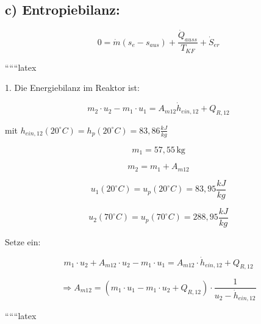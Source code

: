 \subsection*{c) Entropiebilanz:}

\[
0 = \dot{m} \left( s_{e} - s_{aus} \right) + \frac{\dot{Q}_{auss}}{T_{KF}} + \dot{S}_{er}
\]

``````latex


1. Die Energiebilanz im Reaktor ist:

\begin{equation}
m_2 \cdot u_2 - m_1 \cdot u_1 = A_{m12} \dot{h}_{ein,12} + Q_{R,12}
\end{equation}

mit $h_{ein,12} (20^\circ C) = h_p(20^\circ C) = 83,86 \frac{kJ}{kg}$

\begin{equation}
m_1 = 57,55 \, \text{kg}
\end{equation}

\begin{equation}
m_2 = m_1 + A_{m12}
\end{equation}

\begin{equation}
u_1 (20^\circ C) = u_p(20^\circ C) = 83,95 \frac{kJ}{kg}
\end{equation}

\begin{equation}
u_2 (70^\circ C) = u_p(70^\circ C) = 288,95 \frac{kJ}{kg}
\end{equation}

Setze ein:

\begin{equation}
m_1 \cdot u_2 + A_{m12} \cdot u_2 - m_1 \cdot u_1 = A_{m12} \cdot \dot{h}_{ein,12} + Q_{R,12}
\end{equation}

\begin{equation}
\Rightarrow A_{m12} = \left( m_1 \cdot u_1 - m_1 \cdot u_2 + Q_{R,12} \right) \cdot \frac{1}{u_2 - \dot{h}_{ein,12}}
\end{equation}

``````latex